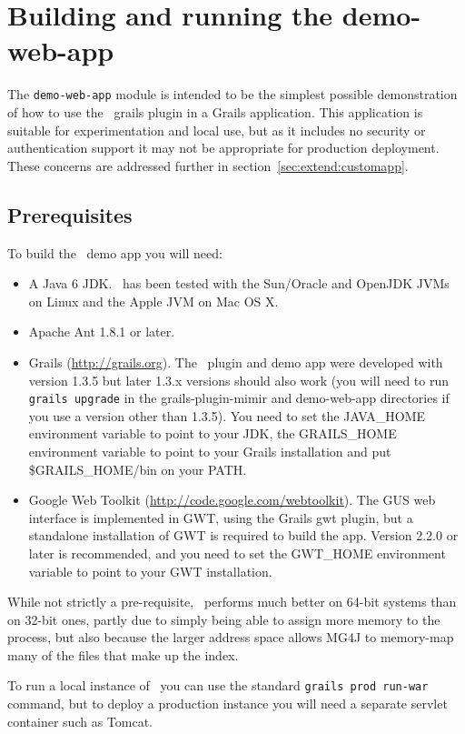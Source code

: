 \section{Building and running the demo-web-app}

The {\tt demo-web-app} module is intended to be the simplest possible
demonstration of how to use the \Mimir\ grails plugin in a Grails application.
This application is suitable for experimentation and local use, but as it
includes no security or authentication support it may not be appropriate for
production deployment.  These concerns are addressed further in
section~\ref{sec:extend:customapp}.

\subsection{Prerequisites}

To build the \Mimir\ demo app you will need:
\begin{itemize}
\item A Java 6 JDK.  \Mimir\ has been tested with the Sun/Oracle and OpenJDK
  JVMs on Linux and the Apple JVM on Mac OS X.
\item Apache Ant 1.8.1 or later.
\item Grails (\url{http://grails.org}).  The \Mimir\ plugin and demo app were
  developed with version 1.3.5 but later 1.3.x versions should also work (you
  will need to run {\tt grails upgrade} in the grails-plugin-mimir and
  demo-web-app directories if you use a version other than 1.3.5).  You need to
  set the JAVA\_HOME environment variable to point to your JDK, the
  GRAILS\_HOME environment variable to point to your Grails installation and
  put \$GRAILS\_HOME/bin on your PATH.
\item Google Web Toolkit (\url{http://code.google.com/webtoolkit}).  The GUS
  web interface is implemented in GWT, using the Grails gwt plugin, but a
  standalone installation of GWT is required to build the app.  Version 2.2.0
  or later is recommended, and you need to set the GWT\_HOME environment
  variable to point to your GWT installation.
\end{itemize}

While not strictly a pre-requisite, \Mimir\ performs much better on 64-bit
systems than on 32-bit ones, partly due to simply being able to assign more
memory to the process, but also because the larger address space allows MG4J to
memory-map many of the files that make up the index.

To run a local instance of \Mimir\ you can use the standard {\tt grails prod
run-war} command, but to deploy a production instance you will need a separate
servlet container such as Tomcat.

